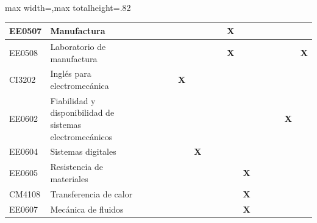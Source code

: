 \begin{center}
\begin{adjustbox}{max width=\textwidth,max totalheight=.82\textheight}
\begin{tabular}{|l|p{4.6cm}|c|c|c|c|c|c|c|c|c|c|c|c|c|c|c|}
EE0507 & Manufactura & \textbf{ } & \textbf{ } & \textbf{ } & \textbf{ } & \textbf{ } & \textbf{ } & \textbf{ } & \textbf{ } & \textbf{X} & \textbf{ } & \textbf{ } & \textbf{ } & \textbf{ } & \textbf{ } & \textbf{ } \\ \hline
EE0508 & Laboratorio de manufactura & \textbf{ } & \textbf{ } & \textbf{ } & \textbf{ } & \textbf{ } & \textbf{ } & \textbf{ } & \textbf{ } & \textbf{X} & \textbf{ } & \textbf{ } & \textbf{ } & \textbf{ } & \textbf{ } & \textbf{X} \\ \hline
\rowcolor{azulTabla}
CI3202 & Inglés para electromecánica & \textbf{ } & \textbf{ } & \textbf{ } & \textbf{ } & \textbf{X} & \textbf{ } & \textbf{ } & \textbf{ } & \textbf{ } & \textbf{ } & \textbf{ } & \textbf{ } & \textbf{ } & \textbf{ } & \textbf{ } \\ \hline
EE0602 & Fiabilidad y disponibilidad de sistemas electromecánicos & \textbf{ } & \textbf{ } & \textbf{ } & \textbf{ } & \textbf{ } & \textbf{ } & \textbf{ } & \textbf{ } & \textbf{ } & \textbf{ } & \textbf{ } & \textbf{ } & \textbf{ } & \textbf{X} & \textbf{ } \\ \hline
\rowcolor{azulTabla}
EE0604 & Sistemas digitales & \textbf{ } & \textbf{ } & \textbf{ } & \textbf{ } & \textbf{ } & \textbf{X} & \textbf{ } & \textbf{ } & \textbf{ } & \textbf{ } & \textbf{ } & \textbf{ } & \textbf{ } & \textbf{ } & \textbf{ } \\ \hline
EE0605 & Resistencia de materiales & \textbf{ } & \textbf{ } & \textbf{ } & \textbf{ } & \textbf{ } & \textbf{ } & \textbf{ } & \textbf{ } & \textbf{ } & \textbf{X} & \textbf{ } & \textbf{ } & \textbf{ } & \textbf{ } & \textbf{ } \\ \hline
\rowcolor{azulTabla}
CM4108 & Transferencia de calor & \textbf{ } & \textbf{ } & \textbf{ } & \textbf{ } & \textbf{ } & \textbf{ } & \textbf{ } & \textbf{ } & \textbf{ } & \textbf{X} & \textbf{ } & \textbf{ } & \textbf{ } & \textbf{ } & \textbf{ } \\ \hline
EE0607 & Mecánica de fluidos & \textbf{ } & \textbf{ } & \textbf{ } & \textbf{ } & \textbf{ } & \textbf{ } & \textbf{ } & \textbf{ } & \textbf{ } & \textbf{X} & \textbf{ } & \textbf{ } & \textbf{ } & \textbf{ } & \textbf{ } \\ \hline
\end{tabular}
\end{adjustbox}
\end{center}
